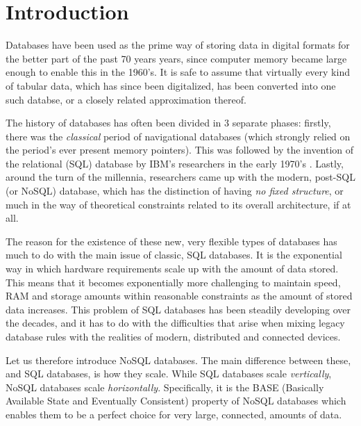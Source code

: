 \documentclass[10pt,        %
               a4paper,     %
               journal,     %
               ]{IEEEtran}
\begin{document}


\section{Introduction}
Databases have been used as the prime way of storing data in digital formats for the better part of the past 70 years years, since computer memory became large enough to enable this in the 1960's. It is safe to assume that virtually every kind of tabular data, which has since been digitalized, has been converted into one such databse, or a closely related approximation thereof. \cite{bachman_1973} \par
The history of databases has often been divided in 3 separate phases: firstly, there was the \textit{classical} period of navigational databases (which strongly relied on the period's ever present memory pointers). This was followed by the invention of the relational (SQL) database by IBM's researchers in the early 1970's \cite{codd_1970}. Lastly, around the turn of the millennia, researchers came up with the modern, post-SQL (or NoSQL) database, which has the distinction of having \textit{no fixed structure}, or much in the way of theoretical constraints related to its overall architecture, if at all. \par
The reason for the existence of these new, very flexible types of databases has much to do with the main issue of classic, SQL databases. It is the exponential way in which hardware requirements scale up with the amount of data stored. This means that it becomes exponentially more challenging to maintain speed, RAM and storage amounts within reasonable constraints as the amount of stored data increases. This problem of SQL databases has been steadily developing over the decades, and it has to do with the difficulties that arise when mixing legacy database rules with the realities of modern, distributed and connected devices. \cite{IEEEpaper1:comparison} \par
Let us therefore introduce NoSQL databases. The main difference between these, and SQL databases, is how they scale. While SQL databases scale \textit{vertically}, NoSQL databases scale \textit{horizontally}. Specifically, it is the BASE (Basically Available State and Eventually Consistent) property of NoSQL databases which enables them to be a perfect choice for very large, connected, amounts of data. \par
\end{document}
